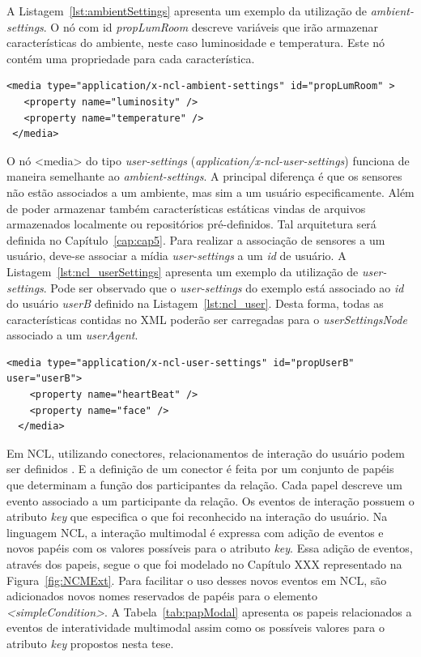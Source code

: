 A Listagem~\ref{lst:ambientSettings} apresenta um exemplo da utilização de \textit{ambient-settings}. O nó com id \textit{propLumRoom} descreve variáveis que irão armazenar características do ambiente, neste caso luminosidade e temperatura. Este nó contém uma propriedade para cada característica.

\begin{lstlisting}[language=ncl,label=lst:ambientSettings, caption={Definição de \textit{AmbientSettingsNode}}]
 <media type="application/x-ncl-ambient-settings" id="propLumRoom" >
   <property name="luminosity" />
   <property name="temperature" />
 </media>
\end{lstlisting}

O nó <media> do tipo \textit{user-settings} (\textit{application/x-ncl-user-settings}) funciona de maneira semelhante ao \textit{ambient-settings}.  A principal diferença é que os sensores não estão associados a um ambiente, mas sim a um usuário especificamente. Além de poder armazenar também características estáticas vindas de arquivos armazenados localmente ou repositórios pré-definidos. Tal arquitetura será definida no Capítulo~\ref{cap:cap5}. Para realizar a associação de sensores a um usuário, deve-se associar a mídia \textit{user-settings} a um \textit{id} de usuário. A Listagem~\ref{lst:ncl_userSettings} apresenta um exemplo da utilização de \textit{user-settings}. Pode ser observado que o \textit{user-settings} do exemplo está associado ao \textit{id} do usuário \textit{userB} definido na Listagem~\ref{lst:ncl_user}. Desta forma, todas as características contidas no XML poderão ser carregadas para o \textit{userSettingsNode} associado a um \textit{userAgent}.

\begin{lstlisting}[language=ncl,label=lst:ncl_userSettings, caption={Definição de \textit{UserSettingsNode}}]
  <media type="application/x-ncl-user-settings" id="propUserB" user="userB">
    <property name="heartBeat" />
    <property name="face" />
  </media>
\end{lstlisting}

Em NCL, utilizando conectores, relacionamentos de interação do usuário podem ser definidos \cite{soares2009programando}. E a definição de um conector é feita por um conjunto de papéis que determinam a função dos participantes da relação. Cada papel descreve um evento associado a um participante da relação. Os eventos de interação possuem o atributo \textit{key} que especifica o que foi reconhecido na interação do usuário. Na linguagem NCL, a interação multimodal é expressa com adição de eventos e novos papéis com os valores possíveis para o atributo \textit{key}. Essa adição de eventos, através dos papeis, segue o que foi modelado no Capítulo XXX representado na Figura~\ref{fig:NCMExt}. Para facilitar o uso desses novos eventos em NCL, são adicionados novos nomes reservados de papéis para o elemento  \textit{<simpleCondition>}. A Tabela~\ref{tab:papModal} apresenta os papeis relacionados a eventos de interatividade multimodal assim como os possíveis valores para o atributo \textit{key} propostos nesta tese.


